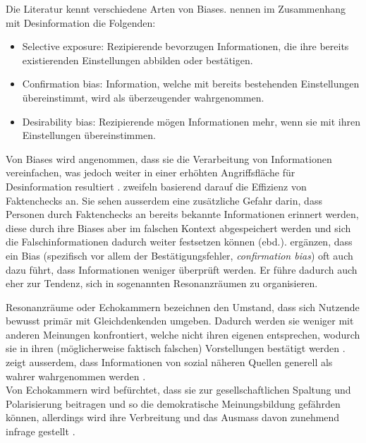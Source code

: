 \documentclass[12pt,a4paper]{article}        %
\begin{document}
Die Literatur kennt verschiedene Arten von Biases. \textcite{lazer_science_2018} nennen im Zusammenhang mit Desinformation die Folgenden:
\begin{itemize}
  \item{Selective exposure}: Rezipierende bevorzugen Informationen, die ihre bereits existierenden Einstellungen abbilden oder bestätigen.
  \item{Confirmation bias}: Information, welche mit bereits bestehenden Einstellungen übereinstimmt, wird als überzeugender wahrgenommen.
  \item{Desirability bias}: Rezipierende mögen Informationen mehr, wenn sie mit ihren Einstellungen übereinstimmen.
\end{itemize}
Von Biases wird angenommen, dass sie die Verarbeitung von Informationen vereinfachen, was jedoch weiter in einer erhöhten Angriffsfläche für Desinformation resultiert \parencite[5]{tandoc_jr_facts_2019}.  \textcite[1095]{lazer_science_2018} zweifeln basierend darauf die Effizienz von Faktenchecks an. Sie sehen ausserdem eine zusätzliche Gefahr darin, dass Personen durch Faktenchecks an bereits bekannte Informationen erinnert werden, diese durch ihre Biases aber im falschen Kontext abgespeichert werden und sich die Falschinformationen dadurch weiter festsetzen können (ebd.). \textcite[250]{hohlfeld_schlechte_2020} ergänzen, dass ein Bias (spezifisch vor allem der Bestätigungsfehler, \textit{confirmation bias}) oft auch dazu führt, dass Informationen weniger überprüft werden. Er führe dadurch auch eher zur Tendenz, sich in sogenannten Resonanzräumen zu organisieren.

Resonanzräume oder Echokammern bezeichnen den Umstand, dass sich Nutzende bewusst primär mit Gleichdenkenden umgeben. Dadurch werden sie weniger mit anderen Meinungen konfrontiert, welche nicht ihren eigenen entsprechen, wodurch sie in ihren (möglicherweise faktisch falschen) Vorstellungen bestätigt werden \parencites[250]{hohlfeld_schlechte_2020}[vgl.\ auch][8]{zoglauer_konstruierte_2021}[222]{schmidt_meinungsbildung_2022}[195]{krafft_disinformation_2020}[8]{grujic_warnhinweise_2024}[221]{allcott_social_2017}. \textcite[139]{tandoc_jr_defining_2018} zeigt ausserdem, dass Informationen von sozial näheren Quellen generell als wahrer wahrgenommen werden \parencite[vgl.\ auch][42]{levak_disinformation_2020}. \\
Von Echokammern wird befürchtet, dass sie zur gesellschaftlichen Spaltung und Polarisierung beitragen \parencite[8]{zoglauer_konstruierte_2021} und so die demokratische Meinungsbildung gefährden können, allerdings wird ihre Verbreitung und das Ausmass davon zunehmend infrage gestellt \parencite[222]{schmidt_meinungsbildung_2022}.
\end{document}
